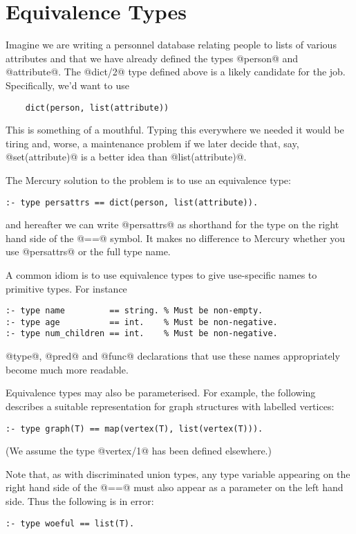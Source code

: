 \section{Equivalence Types}

Imagine we are writing a personnel database relating people to lists of
various attributes and that we have already defined the types @person@ and
@attribute@.
The @dict/2@ type defined above is a likely candidate for the job.
Specifically, we'd want to use
\begin{verbatim}
    dict(person, list(attribute))
\end{verbatim}
This is something of a mouthful.  Typing this everywhere we needed it would be
tiring and, worse, a maintenance problem if we later decide that, say,
@set(attribute)@ is a better idea than @list(attribute)@.

The Mercury solution to the problem is to use an equivalence type:
\begin{verbatim}
:- type persattrs == dict(person, list(attribute)).
\end{verbatim}
and hereafter we can write @persattrs@ as shorthand for the type on the
right hand side of the @==@ symbol.  It makes no difference to Mercury
whether you use @persattrs@ or the full type name.

A common idiom is to use equivalence types to give use-specific names
to primitive types.  For instance
\begin{verbatim}
:- type name         == string. % Must be non-empty.
:- type age          == int.    % Must be non-negative.
:- type num_children == int.    % Must be non-negative.
\end{verbatim}
@type@, @pred@ and @func@ declarations that use these names
appropriately become much more readable.

Equivalence types may also be parameterised.  For example, the following
describes a suitable representation for graph structures with labelled
vertices:
\begin{verbatim}
:- type graph(T) == map(vertex(T), list(vertex(T))).
\end{verbatim}
(We assume the type @vertex/1@ has been defined elsewhere.)

Note that, as with discriminated union types, any type variable appearing on
the right hand side of the @==@ must also appear as a parameter on the left
hand side.  Thus the following is in error:
\begin{verbatim}
:- type woeful == list(T).
\end{verbatim}

